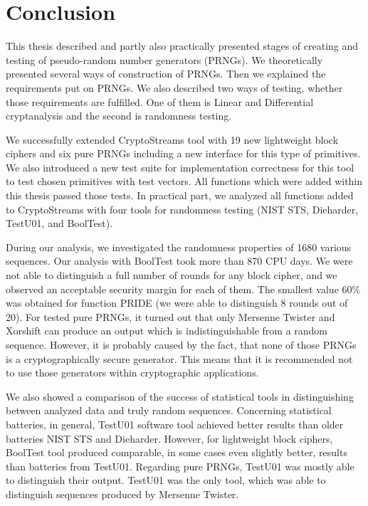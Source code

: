 \documentclass[
    digital,    %
    oneside,    %
    color,
    11pt,
    nocover,
    notable,
    nolof,
    nolot,
    final
]{fithesis3}
\renewcommand\_{\textunderscore\allowbreak}
\begin{document}
\chapter{Conclusion}
\label{chap:conclusion}

This thesis described and partly also practically presented stages of creating and testing of pseudo-random number generators (PRNGs). We theoretically presented several ways of construction of PRNGs. Then we explained the requirements put on PRNGs. We also described two ways of testing, whether those requirements are fulfilled. One of them is Linear and Differential cryptanalysis and the second is randomness testing.

We successfully extended CryptoStreams tool with 19 new lightweight block ciphers and six pure PRNGs including a new interface for this type of primitives. We also introduced a new test suite for implementation correctness for this tool to test chosen primitives with test vectors. All functions which were added within this thesis passed those tests. In practical part, we analyzed all functions added to CryptoStreams with four tools for randomness testing (NIST STS, Dieharder, TestU01, and BoolTest). 

During our analysis, we investigated the randomness properties of 1680 various sequences. Our analysis with BoolTest took more than 870 CPU days. We were not able to distinguish a full number of rounds for any block cipher, and we observed an acceptable security margin for each of them. The smallest value 60\% was obtained for function PRIDE  (we were able to distinguish 8 rounds out of 20). For tested pure PRNGs, it turned out that only Mersenne Twister and Xorshift can produce an output which is indistinguishable from a random sequence. However, it is probably caused by the fact, that none of those PRNGs is a cryptographically secure generator. This means that it is recommended not to use those generators within cryptographic applications.

We also showed a comparison of the success of statistical tools in distinguishing between analyzed data and truly random sequences. Concerning statistical batteries, in general, TestU01 software tool achieved better results than older batteries NIST STS and Dieharder. However, for lightweight block ciphers, BoolTest tool produced comparable, in some cases even slightly better, results than batteries from TestU01. Regarding pure PRNGs, TestU01 was mostly able to distinguish their output. TestU01 was the only tool, which was able to distinguish sequences produced by Mersenne Twister.
\end{document}
